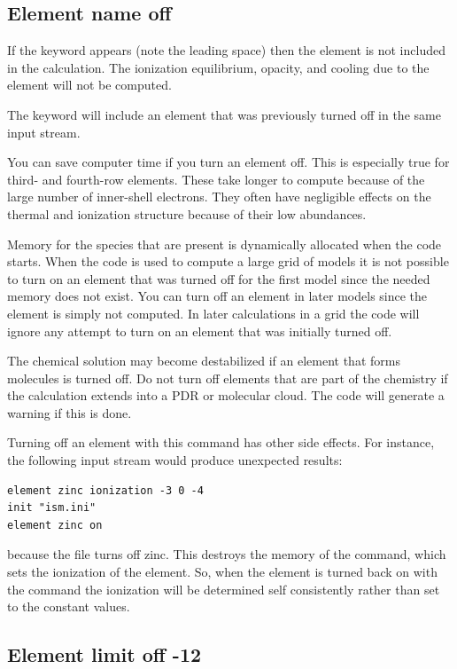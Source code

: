 \subsection{Element name off}

If the keyword  appears
(note the leading space) then the element
is not included in the calculation.
The ionization equilibrium, opacity,
and cooling due to the element will not be computed.

The keyword  will include an element that was
previously turned off in the same input stream.

You can save computer time if you turn an element off.
This is especially
true for third- and fourth-row elements.
These take longer to compute
because of the large number of inner-shell electrons.
They often have
negligible effects on the thermal and ionization structure because of
their low abundances.

Memory for the species that are present is dynamically allocated when
the code starts.
When the code is used to compute a large grid of models
it is not possible to turn on an element that was turned off for the first
model since the needed memory does not exist.
You can turn off an element
in later models since the element is simply not computed.
In later
calculations in a grid the code will ignore any attempt to turn on an
element that was initially turned off.

The chemical solution may become destabilized if an element that forms
molecules is turned off.
Do not turn off elements that are part of the
chemistry if the calculation extends into a PDR or molecular cloud.
The
code will generate a warning if this is done.

Turning off an element with this command has other side effects.
For instance, the following input stream would produce unexpected results:
\begin{verbatim}
element zinc ionization -3 0 -4
init "ism.ini"
element zinc on
\end{verbatim}
because the  file turns off zinc.
This destroys the memory of the
 command,
which sets the ionization of the element.
So, when the element is turned back on with the
 command
the ionization will be determined self consistently rather than set to the
constant values.

\subsection{Element limit off -12}
\label{sec:ElementLimitOffCommand}

